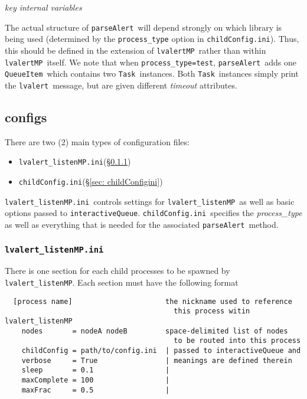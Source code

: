 \documentclass{article}
\newcommand{\alert}{\texttt{lvalert}}
\newcommand{\lvalertMP}{\texttt{lvalertMP}}
\newcommand{\lvalertListenMP}{\texttt{lvalert\_listenMP}}
\newcommand{\interactiveQueue}{\texttt{interactiveQueue}}
\newcommand{\parseAlert}{\texttt{parseAlert}}
\newcommand{\QueueItem}{\texttt{QueueItem}}
\newcommand{\Task}{\texttt{Task}}
\newcommand{\lvalertMPini}{\texttt{lvalert\_listenMP.ini}}
\newcommand{\childConfigini}{\texttt{childConfig.ini}}
\begin{document}
\noindent
\textit{key internal variables}

The actual structure of \parseAlert~will depend strongly on which library is being used (determined by the \texttt{process\_type} option in \childConfigini). 
Thus, this should be defined in the extension of \lvalertMP~rather than within \lvalertMP~itself.
We note that when \texttt{process\_type=test}, \parseAlert~adds one \QueueItem~which contains two \Task~instances. 
Both \Task~instances simply print the \alert~message, but are given different \textit{timeout} attributes.


\subsection{configs}
\label{sec: configs}

There are two (2) main types of configuration files:
\begin{itemize}
    \item{\lvalertMPini (\S\ref{sec: lvalertMPini})}
    \item{\childConfigini (\S\ref{sec: childConfigini})}
\end{itemize}
\lvalertMPini~controls settings for \lvalertListenMP~as well as basic options passed to \interactiveQueue.
\childConfigini~specifies the \textit{process\_type} as well as everything that is needed for the associated \parseAlert~method.


\subsubsection{\lvalertMPini}
\label{sec: lvalertMPini}

There is one section for each child processes to be spawned by \lvalertListenMP.
Each section must have the following format

\begin{verbatim}
  [process name]                      the nickname used to reference 
                                        this process witin lvalert_listenMP
    nodes       = nodeA nodeB         space-delimited list of nodes 
                                        to be routed into this process
    childConfig = path/to/config.ini  | passed to interactiveQueue and 
    verbose     = True                | meanings are defined therein
    sleep       = 0.1                 |
    maxComplete = 100                 |
    maxFrac     = 0.5                 |
\end{verbatim}
\end{document}
